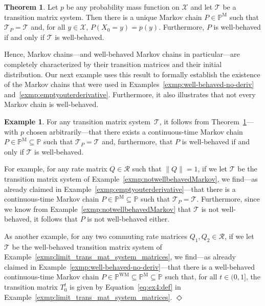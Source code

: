 \documentclass[10pt,a4paper]{paper}
\theoremstyle{definition}
\newtheorem{exmp}{Example}%
\newtheorem{theorem}{Theorem}[section]
\newcommand{\states}{\mathcal{X}}
\newcommand{\processes}{\mathbb{P}}
\newcommand{\mprocesses}{\processes^{\mathrm{M}}}
\newcommand{\wmprocesses}{\processes^{\mathrm{WM}}}
\newcommand{\norm}[1]{\left\lVert #1 \right\rVert}
\newcommand{\exampleend}{\hfill$\Diamond$}
\begin{document}
\begin{theorem}\label{theo:uniqueMarkovchain}
Let $p$ be any probability mass function on $\states$ and let $\mathcal{T}$ be a transition matrix system. Then there is a unique Markov chain $P\in\mprocesses$ such that $\mathcal{T}_P=\mathcal{T}$ and, for all $y\in\states$, $P(X_0=y)=p(y)$. Furthermore, $P$ is well-behaved if and only if $\mathcal{T}$ is well-behaved.
\end{theorem}

Hence, Markov chains---and well-behaved Markov chains in particular---are completely characterized by their transition matrices and their initial distribution. Our next example uses this result to formally establish the existence of the Markov chains that were used in Examples~\ref{exmp:well-behaved-no-deriv} and~\ref{exmp:emptyouterderivative}. Furthermore, it also illustrates that not every Markov chain is well-behaved.

\begin{exmp}\label{exmp:twoexamplesofMarkovchains}
For any transition matrix system~$\mathcal{T}$, it follows from Theorem~\ref{theo:uniqueMarkovchain}---with $p$ chosen arbitrarily---that there exists a continuous-time Markov chain $P\in\mprocesses\subseteq\processes$ such that $\mathcal{T}_P=\mathcal{T}$ and, furthermore, that $P$ is well-behaved if and only if $\mathcal{T}$ is well-behaved.

For example, for any rate matrix $Q\in\mathcal{R}$ such that $\norm{Q}=1$, if we let $\mathcal{T}$ be the transition matrix system of Example~\ref{exmp:notwellbehavedMarkov}, we find---as already claimed in Example~\ref{exmp:emptyouterderivative}---that there is a continuous-time Markov chain $P\in\mprocesses\subseteq\processes$ such that $\mathcal{T}_P=\mathcal{T}$. Furthermore, since we know from Example~\ref{exmp:notwellbehavedMarkov} that $\mathcal{T}$ is not well-behaved, it follows that $P$ is not well-behaved either.

As another example, for any two commuting rate matrices $Q_1,Q_2\in\mathcal{R}$, if we let $\mathcal{T}$ be the well-behaved transition matrix system of Example~\ref{exmp:limit_trans_mat_system_matrices}, we find---as already claimed in Example~\ref{exmp:well-behaved-no-deriv}---that there is a well-behaved continuous-time Markov chain $P\in\wmprocesses\subseteq\mprocesses\subseteq\processes$ such that, for all $t\in(0,1]$, the transition matrix $T_0^t$ is given by Equation~\eqref{eq:ex4:def} in Example~\ref{exmp:limit_trans_mat_system_matrices}.
\exampleend
\end{exmp}
\end{document}
